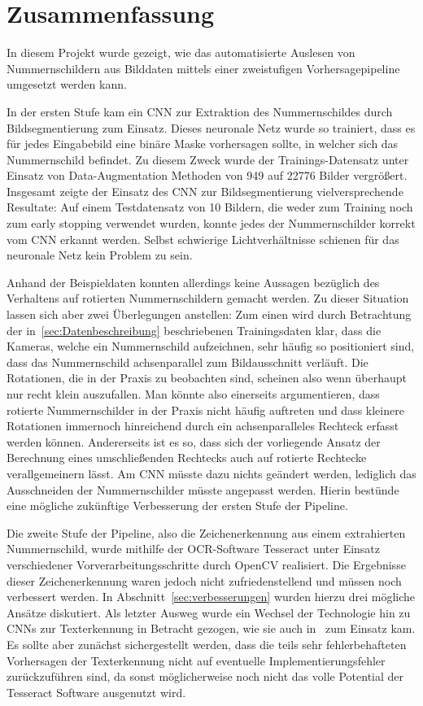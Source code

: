 \section{Zusammenfassung}
\label{sec:zusammenfassung}

In diesem Projekt wurde gezeigt, wie das automatisierte Auslesen
von Nummernschildern aus Bilddaten mittels einer zweistufigen
Vorhersagepipeline umgesetzt werden kann.

In der ersten Stufe kam ein CNN zur Extraktion des Nummernschildes durch
Bildsegmentierung zum Einsatz.
Dieses neuronale Netz wurde so trainiert, dass es f\"ur jedes
Eingabebild eine bin\"are Maske vorhersagen sollte, in welcher
sich das Nummernschild befindet.
Zu diesem Zweck wurde der Trainings-Datensatz unter
Einsatz von Data-Augmentation Methoden von 949 auf 22776 Bilder
vergr\"o{\ss}ert.
Insgesamt zeigte der Einsatz des CNN zur Bildsegmentierung vielversprechende
Resultate: Auf einem Testdatensatz von 10 Bildern, die weder zum Training
noch zum early stopping verwendet wurden, konnte jedes der Nummernschilder
korrekt vom CNN erkannt werden. Selbst schwierige Lichtverh\"altnisse schienen
f\"ur das neuronale Netz kein Problem zu sein.

Anhand der Beispieldaten konnten allerdings keine Aussagen bez\"uglich
des Verhaltens auf rotierten Nummernschildern gemacht werden.
Zu dieser Situation lassen sich aber zwei \"Uberlegungen anstellen:
Zum einen wird durch Betrachtung der in~\ref{sec:Datenbeschreibung}
beschriebenen Trainingsdaten klar, dass die Kameras, welche ein Nummernschild
aufzeichnen, sehr h\"aufig so positioniert sind, dass das Nummernschild
achsenparallel zum Bildausschnitt verl\"auft. Die Rotationen, die in der
Praxis zu beobachten sind, scheinen also wenn \"uberhaupt nur recht
klein auszufallen. Man k\"onnte also einerseits argumentieren, dass
rotierte Nummernschilder in der Praxis nicht h\"aufig auftreten und dass
kleinere Rotationen immernoch hinreichend durch ein achsenparalleles
Rechteck erfasst werden k\"onnen.
Andererseits ist es so, dass sich der vorliegende Ansatz der
Berechnung eines umschlie{\ss}enden Rechtecks auch auf rotierte
Rechtecke verallgemeinern l\"asst. Am CNN m\"usste dazu nichts ge\"andert
werden, lediglich das Ausschneiden der Nummernschilder m\"usste
angepasst werden. Hierin best\"unde eine m\"ogliche zuk\"unftige
Verbesserung der ersten Stufe der Pipeline.

Die zweite Stufe der Pipeline, also die Zeichenerkennung aus einem
extrahierten Nummernschild, wurde mithilfe der OCR-Software Tesseract
unter Einsatz verschiedener Vorverarbeitungsschritte durch OpenCV realisiert.
Die Ergebnisse dieser Zeichenerkennung waren jedoch nicht
zufriedenstellend und m\"ussen noch verbessert werden.
In Abschnitt~\ref{sec:verbesserungen} wurden hierzu drei m\"ogliche
Ans\"atze diskutiert. Als letzter Ausweg wurde ein Wechsel der
Technologie hin zu CNNs zur Texterkennung in Betracht gezogen, wie sie
auch in~\cite{silva2018a} zum Einsatz kam. Es sollte
aber zun\"achst sichergestellt werden, dass die teils sehr
fehlerbehafteten Vorhersagen der Texterkennung nicht auf eventuelle
Implementierungsfehler zur\"uckzuf\"uhren sind, da sonst
m\"oglicherweise noch nicht das volle Potential der Tesseract Software
ausgenutzt wird.

